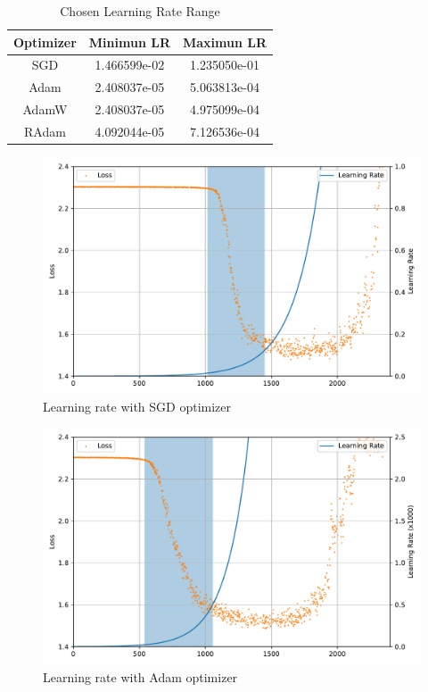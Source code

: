 \documentclass{article}
\begin{document}
\begin{table}[ht!]
    \centering
    \caption{Chosen Learning Rate Range}\label{tab:lr_range}
    \begin{tabular}{ccc}
        \toprule
        Optimizer & Minimun LR   & Maximun LR   \\
        \midrule
        SGD       & 1.466599e-02 & 1.235050e-01 \\
        Adam      & 2.408037e-05 & 5.063813e-04 \\
        AdamW     & 2.408037e-05 & 4.975099e-04 \\
        RAdam     & 4.092044e-05 & 7.126536e-04 \\
        \bottomrule
    \end{tabular}
\end{table}

\begin{figure}[ht!]
    \centering
    \includegraphics[scale=0.64]{images/lr_range_sgd.pdf}
    \caption{Learning rate with SGD optimizer}\label{fig:lr_range_sgd}
\end{figure}

\begin{figure}[ht!]
    \centering
    \includegraphics[scale=0.64]{images/lr_range_adam.pdf}
    \caption{Learning rate with Adam optimizer}\label{fig:lr_range_adam}
\end{figure}
\end{document}
